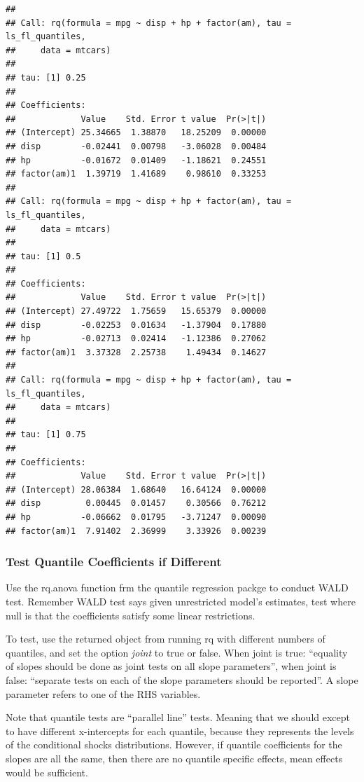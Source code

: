 \documentclass[
]{book}
\begin{document}
\begin{verbatim}
## 
## Call: rq(formula = mpg ~ disp + hp + factor(am), tau = ls_fl_quantiles, 
##     data = mtcars)
## 
## tau: [1] 0.25
## 
## Coefficients:
##             Value    Std. Error t value  Pr(>|t|)
## (Intercept) 25.34665  1.38870   18.25209  0.00000
## disp        -0.02441  0.00798   -3.06028  0.00484
## hp          -0.01672  0.01409   -1.18621  0.24551
## factor(am)1  1.39719  1.41689    0.98610  0.33253
## 
## Call: rq(formula = mpg ~ disp + hp + factor(am), tau = ls_fl_quantiles, 
##     data = mtcars)
## 
## tau: [1] 0.5
## 
## Coefficients:
##             Value    Std. Error t value  Pr(>|t|)
## (Intercept) 27.49722  1.75659   15.65379  0.00000
## disp        -0.02253  0.01634   -1.37904  0.17880
## hp          -0.02713  0.02414   -1.12386  0.27062
## factor(am)1  3.37328  2.25738    1.49434  0.14627
## 
## Call: rq(formula = mpg ~ disp + hp + factor(am), tau = ls_fl_quantiles, 
##     data = mtcars)
## 
## tau: [1] 0.75
## 
## Coefficients:
##             Value    Std. Error t value  Pr(>|t|)
## (Intercept) 28.06384  1.68640   16.64124  0.00000
## disp         0.00445  0.01457    0.30566  0.76212
## hp          -0.06662  0.01795   -3.71247  0.00090
## factor(am)1  7.91402  2.36999    3.33926  0.00239
\end{verbatim}

\hypertarget{test-quantile-coefficients-if-different}{%
\subsubsection{Test Quantile Coefficients if Different}\label{test-quantile-coefficients-if-different}}

Use the rq.anova function frm the quantile regression packge to conduct WALD test. Remember WALD test says given unrestricted model's estimates, test where null is that the coefficients satisfy some linear restrictions.

To test, use the returned object from running rq with different numbers of quantiles, and set the option \emph{joint} to true or false. When joint is true: ``equality of slopes should be done as joint tests on all slope parameters'', when joint is false: ``separate tests on each of the slope parameters should be reported''. A slope parameter refers to one of the RHS variables.

Note that quantile tests are ``parallel line'' tests. Meaning that we should except to have different x-intercepts for each quantile, because they represents the levels of the conditional shocks distributions. However, if quantile coefficients for the slopes are all the same, then there are no quantile specific effects, mean effects would be sufficient.
\end{document}
